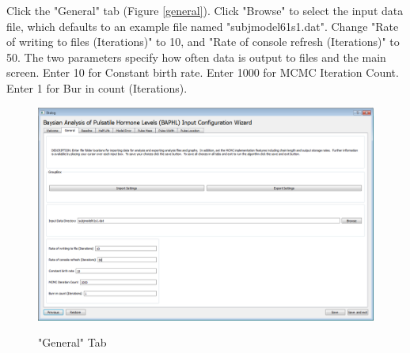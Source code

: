\documentclass[11pt]{book}
\begin{document}
Click the "General" tab (Figure \ref{general}).  Click "Browse" to select the input data file, which defaults to an example file named "subjmodel61s1.dat".  Change "Rate of writing to files (Iterations)" to 10, and "Rate of console refresh (Iterations)" to 50.  The two parameters specify how often data is output to files and the main screen.  Enter 10 for Constant birth rate.  Enter 1000 for MCMC Iteration Count. Enter 1 for Bur in count (Iterations).
\begin{figure}
  \centering
  \includegraphics[width=\textwidth]{generaltab.PNG}\\
  \caption{"General" Tab}\label{singlesubject}
\end{figure}
\end{document}

